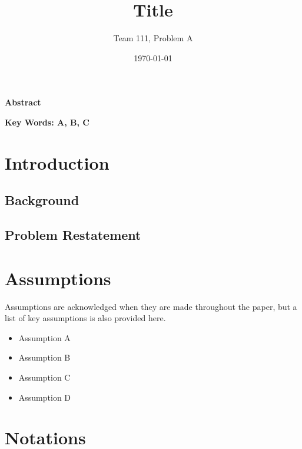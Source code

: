 \documentclass{Setup}
\begin{document}
\title{Title} 
\author{Team 111, Problem A}
\date{\today} 
\maketitle 
\thispagestyle{fancy}


\begin{center}
  \large\textbf{Abstract}
\end{center}

\lipsum[1] %

\textbf{Key Words: A, B, C} %


\newpage
\tableofcontents
\newpage


\section{Introduction}
\subsection{Background}
\lipsum[1] %

\subsection{Problem Restatement}
\lipsum[1] %


\section{Assumptions}
Assumptions are acknowledged when they are made throughout the paper, but a list
of key assumptions is also provided here.

\begin{itemize} %
    \item Assumption A
    \item Assumption B
    \item Assumption C
    \item Assumption D
\end{itemize}

\newpage
\section{Notations}
\end{document}

